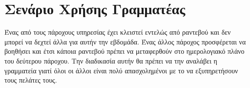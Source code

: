 \section{Σενάριο Χρήσης Γραμματέας}
Ένας από τους πάροχους υπηρεσίας έχει κλειστεί εντελώς από ραντεβού και δεν μπορεί να δεχτεί άλλα για αυτήν την εβδομάδα. Ένας άλλος πάροχος προσφέρεται να βοηθήσει και έτσι κάποια ραντεβού πρέπει να μεταφερθούν στο ημερολογιακό πλάνο του δεύτερου πάροχου. Την διαδικασία αυτήν θα πρέπει να την αναλάβει η γραμματεία γιατί όλοι οι άλλοι είναι πολύ απασχολημένοι με το να εξυπηρετήσουν τους πελάτες τους.